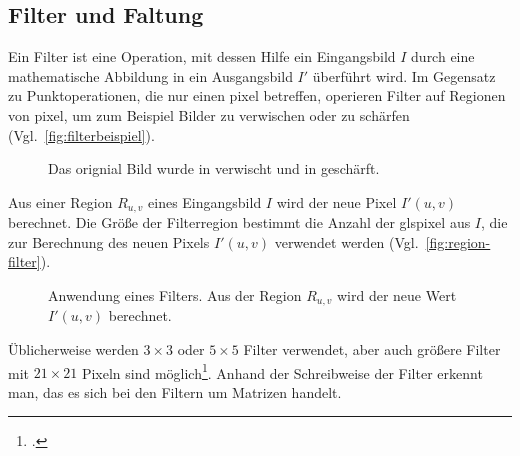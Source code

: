 \subsection{Filter und Faltung} %
\label{sub:filter}
Ein Filter ist eine Operation, mit dessen Hilfe ein Eingangsbild $I$ durch eine mathematische Abbildung in ein
 Ausgangsbild $I'$ überführt wird. Im Gegensatz zu Punktoperationen, die nur einen \gls{pixel} betreffen, operieren
 Filter auf Regionen von \gls{pixel}, um zum Beispiel Bilder zu verwischen oder zu schärfen
 (Vgl.~\autoref{fig:filterbeispiel}).
\begin{figure}[!ht]
	\centering
	\caption{Das orignial Bild  wurde in
	  verwischt und in  geschärft.}
	\label{fig:filterbeispiel}
\end{figure}

Aus einer Region $R_{u,v}$ eines Eingangsbild $I$ wird der neue Pixel $I'(u,v)$ berechnet. Die Größe der
 Filterregion bestimmt die Anzahl der gls{pixel} aus $I$, die zur Berechnung des neuen Pixels $I'(u,v)$ verwendet
 werden (Vgl.~\autoref{fig:region-filter}).
\begin{figure}[!ht]
	\centering
	
	\caption{Anwendung eines Filters. Aus der Region $R_{u,v}$ wird der neue Wert $I'(u,v)$ berechnet.}
	\label{fig:region-filter}
\end{figure}
Üblicherweise werden $3 \times 3$ oder $5 \times 5$ Filter verwendet, aber auch größere Filter mit $21 \times 21$
 Pixeln sind möglich\footcite[Vgl.][S.~90--91]{burger05}. Anhand der Schreibweise der Filter erkennt man, das es sich
 bei den Filtern um Matrizen handelt.

